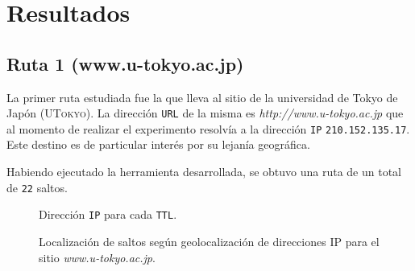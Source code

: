 \section{Resultados}

\subsection{Ruta 1 (www.u-tokyo.ac.jp)}

La primer ruta estudiada fue la que lleva al sitio de la
universidad de Tokyo de Japón (\textsc{UTokyo}). La dirección \texttt{URL} de la
misma es \emph{http://www.u-tokyo.ac.jp} que al momento de realizar el
experimento resolvía a la dirección \texttt{IP} \texttt{210.152.135.17}. Este
destino es de particular interés por su lejanía geográfica.

Habiendo ejecutado la herramienta desarrollada, se obtuvo una ruta de un total
de \texttt{22} saltos.

\begin{figure}[H]
    \caption{Dirección \texttt{IP} para cada \texttt{TTL}.}
\end{figure}

\begin{figure*}[h]
    \caption{Localización de saltos según geolocalización de direcciones IP para
    el sitio \emph{www.u-tokyo.ac.jp}.}
\end{figure*}
